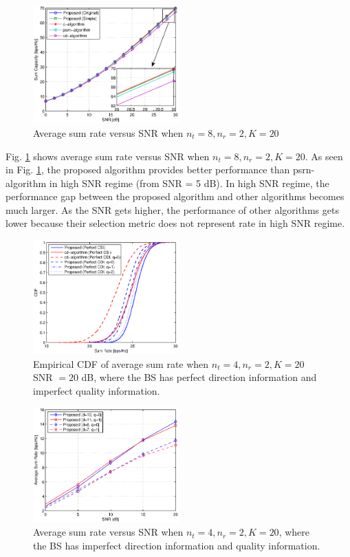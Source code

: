 \documentclass[journal,twoside]{IEEEtranTCOM}
\begin{document}
\begin{figure}[!tb]
    \centering
    \includegraphics[width=0.50\textwidth]{RateVSSNR.eps}
\caption{Average sum rate versus SNR when $n_t=8, n_r=2, K = 20$}  \label{Figure:RateVSSNR}
\end{figure}

Fig. \ref{Figure:RateVSSNR} shows average sum rate versus SNR when $n_t=8, n_r=2, K = 20$. As seen in Fig. \ref{Figure:RateVSSNR}, the proposed algorithm provides better performance than psrn-algorithm in high SNR regime (from SNR = 5 dB). In high SNR regime, the performance gap between the proposed algorithm and other algorithms becomes much larger. As the SNR gets higher, the performance of other algorithms gets lower because their selection metric does not represent rate in high SNR regime.

\begin{figure}[!tb]
    \centering
    \includegraphics[width=0.50\textwidth]{CDF_fullCDI20dB.eps}
\caption{Empirical CDF of average sum rate when $n_t=4, n_r=2, K=20$ SNR $= 20$ dB, where the BS has perfect direction information and imperfect quality information.}  \label{Figure:FullCDI}
\end{figure}

\begin{figure}[!tb]
    \centering
    \includegraphics[width=0.50\textwidth]{12_8bits.eps}
\caption{Average sum rate versus SNR when $n_t=4, n_r=2, K = 20$, where the BS has imperfect direction information and quality information.}  \label{Figure:PartialCDI}
\end{figure}
\end{document}
